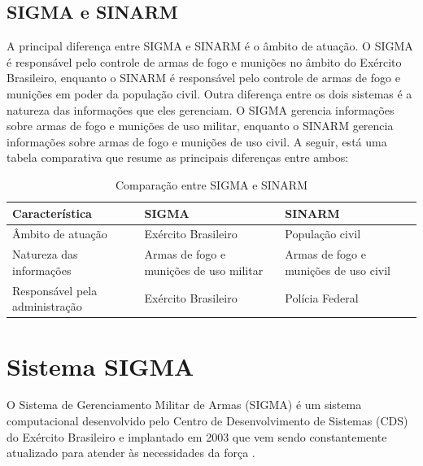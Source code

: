 \subsection{SIGMA e SINARM}\label{sigmaesinarm}
A principal diferença entre SIGMA e SINARM é o âmbito de atuação. O SIGMA é responsável pelo controle de armas de fogo e munições no âmbito do Exército Brasileiro, enquanto o SINARM é responsável pelo controle de armas de fogo e munições em poder da população civil.
Outra diferença entre os dois sistemas é a natureza das informações que eles gerenciam. O SIGMA gerencia informações sobre armas de fogo e munições de uso militar, enquanto o SINARM gerencia informações sobre armas de fogo e munições de uso civil.
A seguir, está uma tabela comparativa que resume as principais diferenças entre ambos: 
\begin{table}[ht]
	\centering
	\caption{Comparação entre SIGMA e SINARM}
	\begin{tabularx}{\textwidth}{lXp{5cm}}
	  \toprule
	  Característica & SIGMA & SINARM \\
	  \midrule
	  Âmbito de atuação & Exército Brasileiro & População civil \\
	  Natureza das informações & Armas de fogo e munições de uso militar & Armas de fogo e munições de uso civil \\
	  Responsável pela administração & Exército Brasileiro & Polícia Federal \\
	  \bottomrule
	\end{tabularx}
  \end{table}

  

\section{ Sistema SIGMA } 
O Sistema de Gerenciamento Militar de Armas (SIGMA) é um sistema computacional desenvolvido pelo Centro de Desenvolvimento de Sistemas (CDS) do Exército Brasileiro e  implantado em 2003 que vem sendo constantemente atualizado para atender às necessidades da força \cite{fenemeReunixE3oSobre}.

